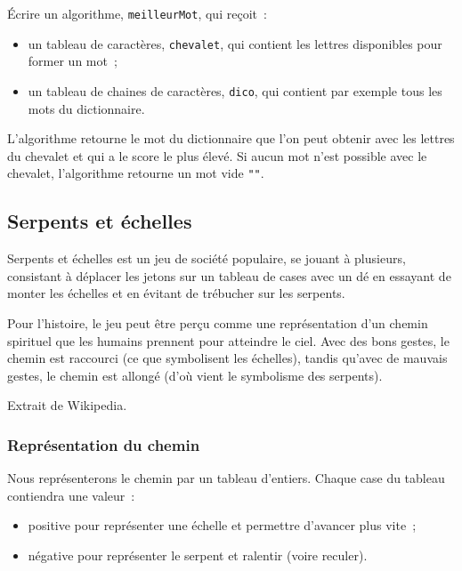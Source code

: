 			\'Ecrire un algorithme, \texttt{meilleurMot}, qui reçoit~:
			\begin{itemize}
			\item un tableau de caractères, \texttt{chevalet}, qui contient les lettres disponibles pour former un mot~;
			\item un tableau de chaines de caractères, \texttt{dico}, qui contient par exemple tous les mots du dictionnaire.
			\end{itemize}
			L’algorithme retourne le mot du dictionnaire que l’on peut obtenir avec les lettres du chevalet 
			et qui a le score le plus élevé. 
			Si aucun mot n’est possible avec le chevalet, l’algorithme retourne un mot vide \texttt{""}.
	


	\subsection{Serpents et échelles}

		Serpents et échelles est un jeu de société populaire, se jouant
		à plusieurs, consistant à déplacer les jetons sur un tableau de cases
		avec un dé en essayant de monter les échelles et en évitant de trébucher
		sur les serpents.	
	
		Pour l’histoire, le jeu peut être perçu comme une représentation d’un
		chemin spirituel que les humains prennent pour atteindre le ciel. Avec
		des bons gestes, le chemin est raccourci (ce que symbolisent les
		échelles), tandis qu’avec de mauvais gestes, le chemin est allongé (d’où
		vient le symbolisme des serpents).  
		
		\begin{flushright} 
			Extrait de Wikipedia.		
		\end{flushright}
		
		\subsubsection*{Représentation du chemin}
		
			Nous représenterons le chemin par un tableau d’entiers. 
			Chaque case du tableau contiendra une valeur~:
			\begin{itemize}
				
				\item positive pour représenter une échelle et permettre
					d’avancer plus vite~;
				
				\item négative pour représenter le serpent et ralentir (voire
					reculer).  
			\end{itemize}
	
